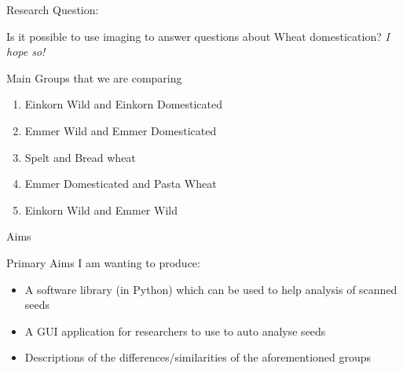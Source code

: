 \documentclass[t, aspectratio=169]{beamer}
\begin{document}
\begin{frame}[label={sec:orgb5d2bb9}]{Research Question:}
\begin{block}{Is it possible to use  imaging to answer questions about Wheat domestication?}
\emph{I hope so!}
\end{block}
\begin{block}{Main Groups that we are comparing}
\begin{enumerate}
\item Einkorn Wild and Einkorn Domesticated
\item Emmer Wild and Emmer Domesticated
\item Spelt and Bread wheat
\item Emmer Domesticated and Pasta Wheat
\item Einkorn Wild and Emmer Wild
\end{enumerate}
\end{block}
\end{frame}


\begin{frame}[label={sec:orgfaebbff}]{Aims}
\begin{block}{Primary Aims}
I am wanting to produce:

\begin{itemize}
\item A software library (in Python) which can be used to help analysis of  scanned seeds
\item A GUI application for researchers to use to auto analyse seeds
\item Descriptions of the differences/similarities of the aforementioned groups
\end{itemize}
\end{block}
\end{frame}
\end{document}
